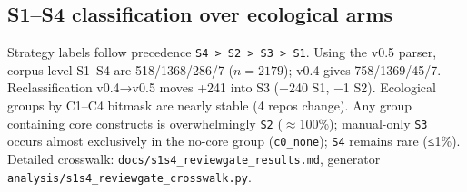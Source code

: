 \subsection{S1--S4 classification over ecological arms}

Strategy labels follow precedence \texttt{S4 > S2 > S3 > S1}. Using the v0.5 parser, corpus-level S1--S4 are 518/1368/286/7 ($n=2179$); v0.4 gives 758/1369/45/7. Reclassification v0.4→v0.5 moves +241 into S3 (−240 S1, −1 S2). Ecological groups by C1--C4 bitmask are nearly stable (4 repos change). Any group containing core constructs is overwhelmingly \texttt{S2} ($\approx$100\%); manual-only \texttt{S3} occurs almost exclusively in the no-core group (\texttt{c0_none}); \texttt{S4} remains rare (≤1\%). Detailed crosswalk: \texttt{docs/s1s4_reviewgate_results.md}, generator \texttt{analysis/s1s4_reviewgate_crosswalk.py}.
